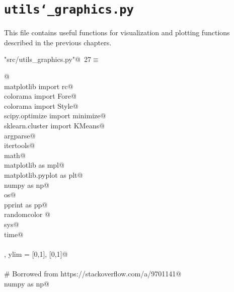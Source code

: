 \documentclass[10pt, english, oneside]{report}
\begin{document}
\begin{appendices}
\begin{flushleft}
\begin{list}{}{\setlength{\itemsep}{-\parsep}\setlength{\itemindent}{-\leftmargin}}
\item{}
\end{list}
\vspace{4ex}
\end{flushleft}
\chapter{\texttt{utils\char`_graphics.py}}

This file contains useful functions for visualization and plotting functions described in the previous chapters.
\begin{flushleft} \small\label{scrap31}\raggedright\small
{} \verb@"src/utils_graphics.py"@\nobreak\ {\footnotesize {27}}$\equiv$
\vspace{-1ex}
\begin{list}{}{} \item
\mbox{}\verb@    @\\
\mbox{}\verb@from matplotlib import rc@\\
\mbox{}\verb@from colorama import Fore@\\
\mbox{}\verb@from colorama import Style@\\
\mbox{}\verb@from scipy.optimize import minimize@\\
\mbox{}\verb@from sklearn.cluster import KMeans@\\
\mbox{}\verb@import argparse@\\
\mbox{}\verb@import itertools@\\
\mbox{}\verb@import math@\\
\mbox{}\verb@import matplotlib as mpl@\\
\mbox{}\verb@import matplotlib.pyplot as plt@\\
\mbox{}\verb@import numpy as np@\\
\mbox{}\verb@import os@\\
\mbox{}\verb@import pprint as pp@\\
\mbox{}\verb@import randomcolor @\\
\mbox{}\verb@import sys@\\
\mbox{}\verb@import time@\\
\mbox{}\verb@@\\
\mbox{}\verb@xlim, ylim = [0,1], [0,1]@\\
\mbox{}\verb@@\\
\mbox{}\verb@# Borrowed from https://stackoverflow.com/a/9701141@\\
\mbox{}\verb@import numpy as np@\\

\end{list}
\end{flushleft}
\end{appendices}
\end{document}
